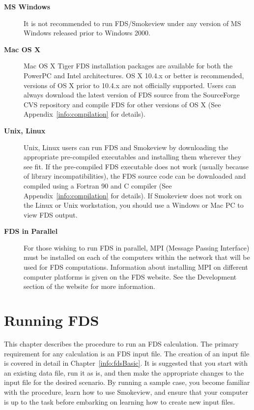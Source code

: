 \documentclass[11pt]{book}
\begin{document}
\begin{description}
\item[{\bf MS Windows}]
It is not recommended to run FDS/Smokeview under any version of MS Windows
released prior to Windows 2000.

\item[{\bf Mac OS X}]
Mac OS X Tiger FDS installation packages are available for both the PowerPC and Intel architectures.
OS X 10.4.x or better is recommended, versions of OS X prior to 10.4.x are not officially supported.
Users can always download the latest version of FDS source from the SourceForge CVS repository and
compile FDS for other versions of OS X (See Appendix~\ref{info:compilation} for details).

\item[{\bf Unix, Linux}]
Unix, Linux users can run FDS and Smokeview by downloading the appropriate pre-compiled
executables and installing them wherever they see fit. If the pre-compiled
FDS executable does not work (usually because of library incompatibilities),
the FDS source code can be downloaded and compiled using a Fortran 90 and
C compiler (See Appendix~\ref{info:compilation} for details). If Smokeview
does not work on the Linux or Unix workstation, you should use a Windows or Mac PC to view FDS output.

\item[{\bf FDS in Parallel}] For those wishing to run FDS in parallel,
MPI (Message Passing Interface) must be installed on each of the
computers within the network that will be used for FDS computations.
Information about installing MPI on different computer platforms is given on the FDS website.
See the Development section of the website for more information.
\end{description}




\chapter{Running FDS}
\label{info:runningFDS}

This chapter describes the procedure to run an FDS calculation.
The primary requirement for any calculation is an FDS input file. The creation of an
input file is covered in detail in Chapter~\ref{info:fdsBasic}.
It is suggested that you start with an existing data file, run it as is,
and then make the appropriate changes to the input file for the
desired scenario. By running a sample case, you become
familiar with the procedure, learn how to use Smokeview, and
ensure that your computer is up to the task before embarking on
learning how to create new input files.
\end{document}
